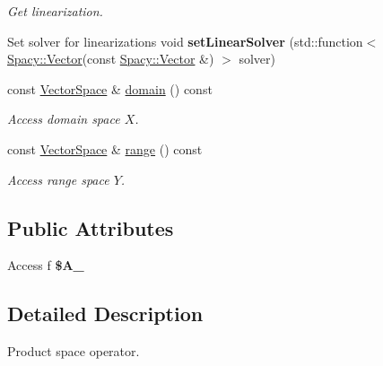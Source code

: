 \begin{DoxyCompactItemize}
\begin{DoxyCompactList}\small\item\em Get linearization. \end{DoxyCompactList}\item 
\hypertarget{classSpacy_1_1ProductSpace_1_1C1Operator_a071d69eb628ee1af30cbc226f89b9eed}{Set solver for linearizations void {\bfseries set\-Linear\-Solver} (std\-::function$<$ \hyperlink{classSpacy_1_1Vector}{Spacy\-::\-Vector}(const \hyperlink{classSpacy_1_1Vector}{Spacy\-::\-Vector} \&) $>$ solver)}\label{classSpacy_1_1ProductSpace_1_1C1Operator_a071d69eb628ee1af30cbc226f89b9eed}

\item 
\hypertarget{classSpacy_1_1OperatorBase_a2588f9b3e0188820c4c494e63293dc6f}{const \hyperlink{classSpacy_1_1VectorSpace}{Vector\-Space} \& \hyperlink{classSpacy_1_1OperatorBase_a2588f9b3e0188820c4c494e63293dc6f}{domain} () const }\label{classSpacy_1_1OperatorBase_a2588f9b3e0188820c4c494e63293dc6f}

\begin{DoxyCompactList}\small\item\em Access domain space $X$. \end{DoxyCompactList}\item 
\hypertarget{classSpacy_1_1OperatorBase_ab19d3b7a6f290b1079248f1e567e53d6}{const \hyperlink{classSpacy_1_1VectorSpace}{Vector\-Space} \& \hyperlink{classSpacy_1_1OperatorBase_ab19d3b7a6f290b1079248f1e567e53d6}{range} () const }\label{classSpacy_1_1OperatorBase_ab19d3b7a6f290b1079248f1e567e53d6}

\begin{DoxyCompactList}\small\item\em Access range space $Y$. \end{DoxyCompactList}\end{DoxyCompactItemize}
\subsection*{Public Attributes}
\begin{DoxyCompactItemize}
\item 
Access f {\bfseries \$\-A\-\_\-}
\end{DoxyCompactItemize}


\subsection{Detailed Description}
Product space operator. 

